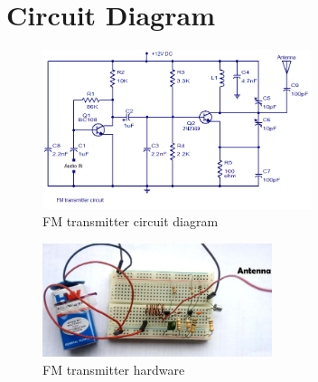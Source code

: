 \chapter{Circuit Diagram}


	\begin{figure}[ht]
		\centering
		\includegraphics[width=0.70\textwidth]{circuit.png}
		\caption{FM transmitter circuit diagram}
		\label{fig:circuit}
	\end{figure}
	


\begin{figure}[ht]
	\centering
	\includegraphics[width=0.60\textwidth]{Circuit-Hardware.jpg}
	\caption{FM transmitter hardware}
	\label{fig:hardware}
\end{figure}




